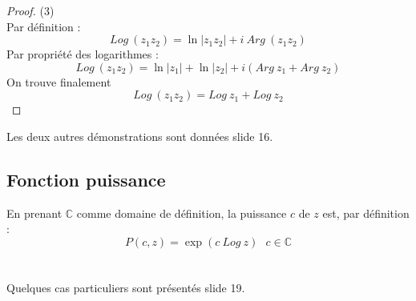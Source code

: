 \begin{proof} (3)\\
	Par définition :
	\begin{equation}
		Log\ (z_1z_2) = \ln|z_1z_2| +i\ Arg\ (z_1z_2)
	\end{equation}
	Par propriété des logarithmes :
	\begin{equation}
		Log\ (z_1z_2) = \ln|z_1|+\ln|z_2| + i(Arg\ z_1 + Arg\ z_2)
	\end{equation}
	On trouve finalement
	\begin{equation}
		Log\ (z_1z_2) = Log\ z_1 +  Log\ z_2
	\end{equation}
\end{proof}
Les deux autres démonstrations sont données slide 16.
        
\subsection{Fonction puissance}
En prenant $\mathbb{C}$ comme domaine de définition, la puissance $c$ de $z$ est, par définition :
\begin{equation}
	P(c,z) = \exp(c\ Log\ z)\ \ \ c\in\mathbb{C}
\end{equation}
\ \\
    
\ \\
Quelques cas particuliers sont présentés slide 19.